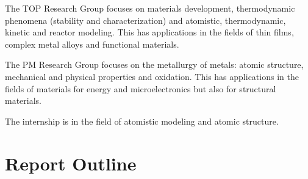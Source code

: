         The TOP Research Group focuses on materials development, thermodynamic phenomena (stability and characterization) and atomistic, thermodynamic, kinetic and reactor modeling. This has applications in the fields of thin films, complex metal alloys and functional materials.

        The PM Research Group focuses on the metallurgy of metals: atomic structure, mechanical and physical properties and oxidation. This has applications in the fields of materials for energy and microelectronics but also for structural materials. 

        The internship is in the field of atomistic modeling and atomic structure. 

\section{Report Outline}
        
